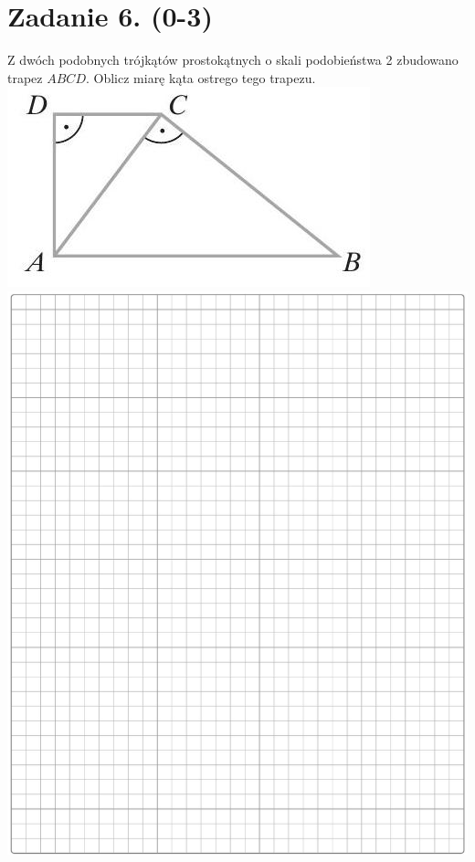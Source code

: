 \documentclass[10pt]{article}
\begin{document}
\section*{Zadanie 6. (0-3)}
Z dwóch podobnych trójkątów prostokątnych o skali podobieństwa 2 zbudowano trapez \(A B C D\). Oblicz miarę kąta ostrego tego trapezu.\\
\includegraphics[max width=\textwidth, center]{2024_11_21_e30d1f37bf0e3631c088g-05}\\
\includegraphics[max width=\textwidth, center]{2024_11_21_e30d1f37bf0e3631c088g-05(1)}
\end{document}
